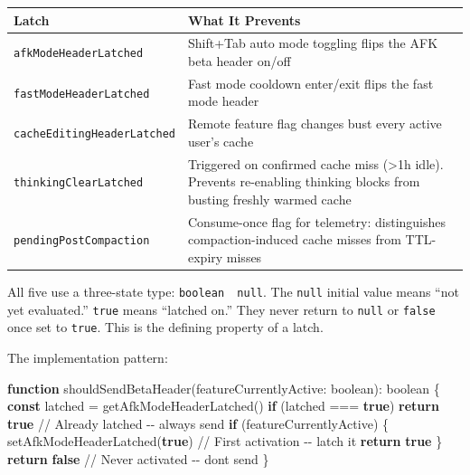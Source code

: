 \documentclass[
  english,
  11pt,
  letterpaper,
]{book}
\newenvironment{Shaded}{\begin{snugshade}}{\end{snugshade}}
\newcommand{\CommentTok}[1]{\textcolor[rgb]{0.37,0.37,0.37}{#1}}
\newcommand{\ControlFlowTok}[1]{\textcolor[rgb]{0.00,0.23,0.31}{\textbf{#1}}}
\newcommand{\DataTypeTok}[1]{\textcolor[rgb]{0.68,0.00,0.00}{#1}}
\newcommand{\FunctionTok}[1]{\textcolor[rgb]{0.28,0.35,0.67}{#1}}
\newcommand{\KeywordTok}[1]{\textcolor[rgb]{0.00,0.23,0.31}{\textbf{#1}}}
\newcommand{\NormalTok}[1]{\textcolor[rgb]{0.00,0.23,0.31}{#1}}
\newcommand{\OperatorTok}[1]{\textcolor[rgb]{0.37,0.37,0.37}{#1}}
\begin{document}
\begin{longtable}[]{@{}
  >{\raggedright\arraybackslash}p{}
  >{\raggedright\arraybackslash}p{}@{}}
\toprule\noalign{}
\begin{minipage}[b]{\linewidth}\raggedright
Latch
\end{minipage} & \begin{minipage}[b]{\linewidth}\raggedright
What It Prevents
\end{minipage} \\
\midrule\noalign{}
\endhead
\bottomrule\noalign{}
\endlastfoot
\texttt{afkModeHeaderLatched} & Shift+Tab auto mode toggling flips the
AFK beta header on/off \\
\texttt{fastModeHeaderLatched} & Fast mode cooldown enter/exit flips the
fast mode header \\
\texttt{cacheEditingHeaderLatched} & Remote feature flag changes bust
every active user's cache \\
\texttt{thinkingClearLatched} & Triggered on confirmed cache miss
(\textgreater1h idle). Prevents re-enabling thinking blocks from busting
freshly warmed cache \\
\texttt{pendingPostCompaction} & Consume-once flag for telemetry:
distinguishes compaction-induced cache misses from TTL-expiry misses \\
\end{longtable}

All five use a three-state type: \texttt{boolean\ \textbar{}\ null}. The
\texttt{null} initial value means ``not yet evaluated.'' \texttt{true}
means ``latched on.'' They never return to \texttt{null} or
\texttt{false} once set to \texttt{true}. This is the defining property
of a latch.

The implementation pattern:

\begin{Shaded}
\begin{Highlighting}[]
\KeywordTok{function} \FunctionTok{shouldSendBetaHeader}\NormalTok{(featureCurrentlyActive}\OperatorTok{:} \DataTypeTok{boolean}\NormalTok{)}\OperatorTok{:} \DataTypeTok{boolean}\NormalTok{ \{}
  \KeywordTok{const}\NormalTok{ latched }\OperatorTok{=} \FunctionTok{getAfkModeHeaderLatched}\NormalTok{()}
  \ControlFlowTok{if}\NormalTok{ (latched }\OperatorTok{===} \KeywordTok{true}\NormalTok{) }\ControlFlowTok{return} \KeywordTok{true}       \CommentTok{// Already latched {-}{-} always send}
  \ControlFlowTok{if}\NormalTok{ (featureCurrentlyActive) \{}
    \FunctionTok{setAfkModeHeaderLatched}\NormalTok{(}\KeywordTok{true}\NormalTok{)          }\CommentTok{// First activation {-}{-} latch it}
    \ControlFlowTok{return} \KeywordTok{true}
\NormalTok{  \}}
  \ControlFlowTok{return} \KeywordTok{false}                             \CommentTok{// Never activated {-}{-} don\textquotesingle{}t send}
\NormalTok{\}}
\end{Highlighting}
\end{Shaded}
\end{document}
